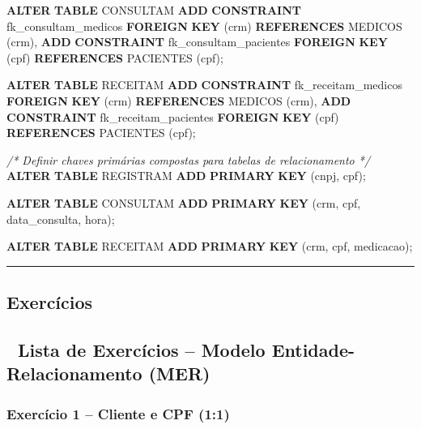 \documentclass[
]{book}
\newenvironment{Shaded}{\begin{snugshade}}{\end{snugshade}}
\newcommand{\CommentTok}[1]{\textcolor[rgb]{0.56,0.35,0.01}{\textit{#1}}}
\newcommand{\KeywordTok}[1]{\textcolor[rgb]{0.13,0.29,0.53}{\textbf{#1}}}
\newcommand{\NormalTok}[1]{#1}
\begin{document}
\begin{Shaded}
\begin{Highlighting}[]
\KeywordTok{ALTER} \KeywordTok{TABLE}\NormalTok{ CONSULTAM}
    \KeywordTok{ADD} \KeywordTok{CONSTRAINT}\NormalTok{ fk\_consultam\_medicos}
        \KeywordTok{FOREIGN} \KeywordTok{KEY}\NormalTok{ (crm)}
        \KeywordTok{REFERENCES}\NormalTok{ MEDICOS (crm),}
    \KeywordTok{ADD} \KeywordTok{CONSTRAINT}\NormalTok{ fk\_consultam\_pacientes}
        \KeywordTok{FOREIGN} \KeywordTok{KEY}\NormalTok{ (cpf)}
        \KeywordTok{REFERENCES}\NormalTok{ PACIENTES (cpf);}

\KeywordTok{ALTER} \KeywordTok{TABLE}\NormalTok{ RECEITAM}
    \KeywordTok{ADD} \KeywordTok{CONSTRAINT}\NormalTok{ fk\_receitam\_medicos}
        \KeywordTok{FOREIGN} \KeywordTok{KEY}\NormalTok{ (crm)}
        \KeywordTok{REFERENCES}\NormalTok{ MEDICOS (crm),}
    \KeywordTok{ADD} \KeywordTok{CONSTRAINT}\NormalTok{ fk\_receitam\_pacientes}
        \KeywordTok{FOREIGN} \KeywordTok{KEY}\NormalTok{ (cpf)}
        \KeywordTok{REFERENCES}\NormalTok{ PACIENTES (cpf);}

\CommentTok{/* Definir chaves primárias compostas para tabelas de relacionamento */}
\KeywordTok{ALTER} \KeywordTok{TABLE}\NormalTok{ REGISTRAM }\KeywordTok{ADD} \KeywordTok{PRIMARY} \KeywordTok{KEY}\NormalTok{ (cnpj, cpf);}

\KeywordTok{ALTER} \KeywordTok{TABLE}\NormalTok{ CONSULTAM }\KeywordTok{ADD} \KeywordTok{PRIMARY} \KeywordTok{KEY}\NormalTok{ (crm, cpf, data\_consulta, hora);}

\KeywordTok{ALTER} \KeywordTok{TABLE}\NormalTok{ RECEITAM  }\KeywordTok{ADD} \KeywordTok{PRIMARY} \KeywordTok{KEY}\NormalTok{ (crm, cpf, medicacao);}
\end{Highlighting}
\end{Shaded}

\begin{center}\rule{0.5\linewidth}{0.5pt}\end{center}

\subsection{Exercícios}\label{exercuxedcios-1}

\subsection{📝 Lista de Exercícios -- Modelo Entidade-Relacionamento (MER)}\label{lista-de-exercuxedcios-modelo-entidade-relacionamento-mer-1}

\subsubsection{Exercício 1 -- Cliente e CPF (1:1)}\label{exercuxedcio-1-cliente-e-cpf-11-1}
\end{document}
